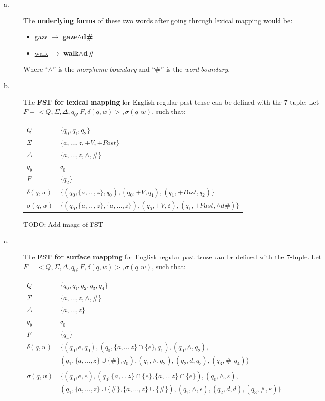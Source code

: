 \documentclass[11pt]{article}
\begin{document}
\begin{solution}
\begin{description}
	\item[a.] The \textbf{underlying forms} of these two words after going through lexical mapping would be:
		\begin{itemize}
			\item \underline{gaze} $\rightarrow$ \textbf{gaze$\wedge$d\#}
			\item \underline{walk} $\rightarrow$ \textbf{walk$\wedge$d\#}
		\end{itemize}
		Where ``$\wedge$'' is the \textit{morpheme boundary} and ``\#'' is the \textit{word boundary}.
	\item[b.] The \textbf{FST for lexical mapping} for English regular past tense can be defined with the 7-tuple:
	Let $F = <Q, \Sigma, \Delta, q_{0}, F, \delta(q, w)>, \sigma(q, w)$, such that:

	\begin{tabular}{l | l}
		$Q$ & $\{ q_{0}, q_{1}, q_{2}\}$ \\
		$\Sigma$ & $\{a, \ldots, z, +V, +Past\}$ \\
		$\Delta$ & $\{a, \ldots, z, \wedge, \# \}$ \\
		$q_{0}$ & $q_{0}$ \\
		$F$ & $\{ q_{2} \}$ \\
		$\delta(q, w)$ &  $\{ (q_{0},\{a, \ldots, z\},q_{0}), (q_{0}, +V, q_{1}), (q_{1}, +Past, q_{2}) \}$ \\
		$\sigma(q, w)$ & $\{ (q_{0},\{a, \ldots, z\},\{a, \ldots, z\}), (q_{0}, +V, \varepsilon), (q_{1}, +Past, \wedge d\#) \}$
	\end{tabular}

	TODO: Add image of FST

	\item[c.] The \textbf{FST for surface mapping} for English regular past tense can be defined with the 7-tuple:
	Let $F = <Q, \Sigma, \Delta, q_{0}, F, \delta(q, w)>, \sigma(q, w)$, such that:

	\begin{tabular}{l | l}
		$Q$ & $\{ q_{0}, q_{1}, q_{2}, q_{3}, q_{4}\}$ \\
		$\Sigma$ & $\{a, \ldots, z, \wedge, \# \}$ \\
		$\Delta$ & $\{a, \ldots, z\}$ \\
		$q_{0}$ & $q_{0}$ \\
		$F$ & $\{ q_{4} \}$ \\
		$\delta(q, w)$ &  $\{(q_{0},e,q_{0}), (q_{0}, \{a, \ldots\, z\} \cap \{e\}, q_{1}), (q_{0},\wedge, q_{2}), $ \\
		 &  $(q_{1},\{a, \ldots, z\} \cup \{\#\},q_{0}), (q_{1}, \wedge , q_{2}), (q_{2}, d, q_{3}), (q_{3}, \#, q_{4})\}$\\
		 & \\
		$\sigma(q, w)$ & $\{(q_{0},e,e), (q_{0}, \{a, \ldots\, z\} \cap \{e\},\{a, \ldots\, z\} \cap \{e\}), (q_{0},\wedge, \varepsilon), $ \\
		 &  $(q_{1},\{a, \ldots, z\} \cup \{\#\},\{a, \ldots, z\} \cup \{\#\}), (q_{1}, \wedge , e), (q_{2}, d, d), (q_{3}, \#, \varepsilon)\}$\\
	\end{tabular}


\end{description}
\end{solution}
\end{document}
